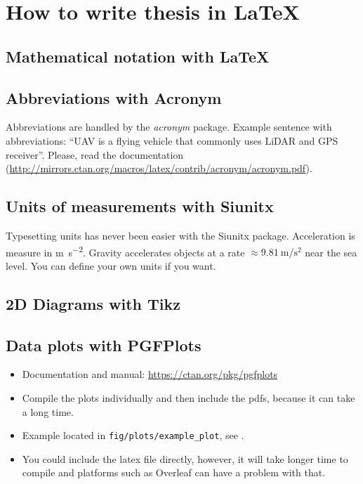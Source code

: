 
\chapter{How to write thesis in LaTeX\label{chap:how_to}}

\section{Mathematical notation with LaTeX}

\section{Abbreviations with Acronym}

Abbreviations are handled by the \emph{acronym} package.
Example sentence with abbreviations: ``\ac{UAV} is a flying vehicle that commonly uses \ac{LiDAR} and \ac{GPS} receiver''.
Please, read the documentation (\url{http://mirrors.ctan.org/macros/latex/contrib/acronym/acronym.pdf}).

\section{Units of measurements with Siunitx}

Typesetting units has never been easier with the Siunitx package.
Acceleration is measure in \si{\meter\per\second\squared}.
Gravity accelerates objects at a rate $\approx \SI{9.81}{\meter\per\second\squared}$ near the sea level.
You can define your own units if you want.

\section{2D Diagrams with Tikz}

\section{Data plots with PGFPlots}

\begin{itemize}
  \item Documentation and manual: \url{https://ctan.org/pkg/pgfplots}
  \item Compile the plots individually and then include the pdfs, because it can take a long time.
  \item Example located in \texttt{fig/plots/example\_plot}, see .
  \item You could include the latex file directly, however, it will take longer time to compile and platforms such as Overleaf can have a problem with that.
\end{itemize}

